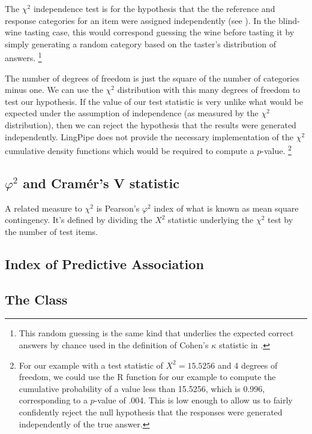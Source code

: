 The $\chi^2$ independence test is for the hypothesis that the the
reference and response categories for an item were assigned
independently (see ).  In the
blind-wine tasting case, this would correspond guessing the wine
before tasting it by simply generating a random category based on the
taster's distribution of answers.%
%
\footnote{This random guessing is the same kind that underlies the
expected correct answers by chance used in the definition of
Cohen's $\kappa$ statistic in .}

The number of degrees of freedom is just the square of the number of
categories minus one.  We can use the $\chi^2$ distribution with this
many degrees of freedom to test our hypothesis.  If the value of our
test statistic is very unlike what would be expected under the
assumption of independence (as measured by the $\chi^2$ distribution),
then we can reject the hypothesis that the results were generated
independently.  LingPipe does not provide the necessary implementation
of the $\chi^2$ cumulative density functions which would be required
to compute a $p$-value.%
%
\footnote{For our example with a test statistic of $X^2 = 15.5256$ and
  4 degrees of freedom, we could use the R function
   for our example to compute the
  cumulative probability of a value less than 15.5256, which is 0.996,
  corresponding to a $p$-value of .004.  This is low enough to allow
  us to fairly confidently reject the null hypothesis that the
  responses were generated independently of the true answer.}


\subsection{$\varphi^2$ and Cram\'er's V statistic}

A related measure to $\chi^2$ is Pearson's $\varphi^2$ index of what
is known as mean square contingency.  It's defined by dividing the
$X^2$ statistic underlying the $\chi^2$ test by the number of test
items. 



\subsection{Index of Predictive Association}



\subsection{The  Class}

